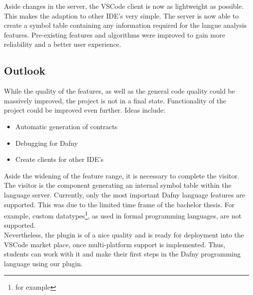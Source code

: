 Aside changes in the server, the VSCode client is now as lightweight as possible.
This makes the adaption to other IDE's very simple.
The server is now able to create a symbol table containing any information required for the langue analysis features.
Pre-existing features and algorithms were improved to gain more reliability and a better user experience.

\subsection{Outlook}
While the quality of the features, as well as the general code quality could be massively improved, the project is not in a final state.
Functionality of the project could be improved even further.
Ideas include:
\begin{itemize}
    \item Automatic generation of contracts
    \item Debugging for Dafny
    \item Create clients for other IDE's
\end{itemize}

Aside the widening of the feature range, it is necessary to complete the visitor.
The visitor is the component generating an internal symbol table within the language server.
Currently, only the most important Dafny language features are supported.
This was due to the limited time frame of the bachelor thesis.
For example, custom datatypes\footnote{for example }, as used in formal programming languages, are not supported.\\

Nevertheless, the plugin is of a nice quality and is ready for deployment into the VSCode market place, once multi-platform support is implemented.
Thus, students can work with it and make their first steps in the Dafny programming language using our plugin.
